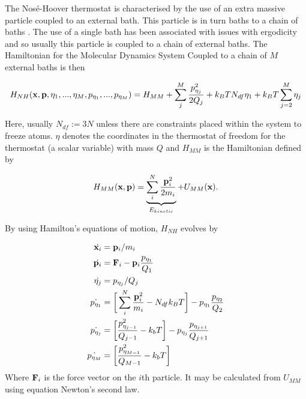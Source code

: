 The Nos\'e-Hoover thermostat is characterised by the use of an extra massive particle coupled to an external bath. This particle is in turn baths to a chain of baths \cite{martyna1992}\cite{martyna1996}. The use of a single bath has been associated with issues with ergodicity and so usually this particle is coupled to a chain of external baths. The Hamiltonian for the Molecular Dynamics System Coupled to a chain of $M$ external baths is then

\begin{equation}
	H_{NH} (\bold{x},\bold{p},\eta_1 , ... , \eta_M, p_{\eta_1}, ...,  p_{\eta_M}  )= H_{MM} + \sum_j^M \frac{p^2_{\eta_j}}{2Q_j} +k_BT  N_{df}   \eta_1   + k_BT \sum_{j=2}^M\eta_j
\end{equation}

Here, usually $N_{df} := 3N$ unless there are constraints placed within the system to freeze atoms. $\eta$ denotes the coordinates in the thermostat of freedom for the thermostat (a scalar variable) with mass $Q$ and $H_{MM}$ is the Hamiltonian defined by 

\begin{equation}
H_{MM}(\bold{x},\bold{p}) = \underbrace{\sum_i^N \frac{\bold{p}_i^2}{2 m_i}}_{E_{kinetic}} + U_{MM} (\bold{x}). 
\end{equation}

By using Hamilton's equations of motion, $H_{NH}$ evolves by

\begin{equation}
	\begin{aligned}
		\dot{\bold{x}_i} &= \bold{p}_i/m_i \\
		\dot{\bold{p}_i} &= \bold{F}_i-\bold{p}_i\frac{p_{\eta_1}}{Q_1} \\
		\dot{\eta_j} &= p_{\eta_j}/Q_j \\
		\dot{p_{\eta_1}} &= \bigg[\sum_i^N \frac{\bold{p}_i^2}{m_i} - N_{df} k_B T\bigg]  - p_{\eta_1}\frac{p_{\eta_2}}{Q_2} \\ 
		\dot{p_{\eta_j}} &= \bigg[ \frac{p^2_{\eta_{j-1}}}{Q_{j-1}} - k_bT \bigg]  - p_{\eta_{j}}\frac{p_{\eta_{j+1}}}{Q_{j+1}} \\ 
		\dot{p_{\eta_M}} &= \bigg[ \frac{p^2_{\eta_{M-1}}}{Q_{M-1}} - k_bT \bigg]
	\end{aligned}
\end{equation}
Where $\bold{F}_i$ is the force vector on the $i$th particle. It may be calculated from $U_{MM}$ using equation Newton's second law. 

